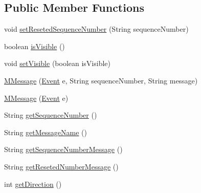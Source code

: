 \subsection*{Public Member Functions}
\begin{DoxyCompactItemize}
\item 
void \hyperlink{classorg_1_1tzi_1_1use_1_1gui_1_1views_1_1diagrams_1_1behavior_1_1communicationdiagram_1_1_m_message_a8eb875d8fff321abd7984dc966efe0e4}{set\-Reseted\-Sequence\-Number} (String sequence\-Number)
\item 
boolean \hyperlink{classorg_1_1tzi_1_1use_1_1gui_1_1views_1_1diagrams_1_1behavior_1_1communicationdiagram_1_1_m_message_a2e6adcd203522b187a2db3bc5a424a6e}{is\-Visible} ()
\item 
void \hyperlink{classorg_1_1tzi_1_1use_1_1gui_1_1views_1_1diagrams_1_1behavior_1_1communicationdiagram_1_1_m_message_a26499a2bac9e344e7029009be9c83bd7}{set\-Visible} (boolean is\-Visible)
\item 
\hyperlink{classorg_1_1tzi_1_1use_1_1gui_1_1views_1_1diagrams_1_1behavior_1_1communicationdiagram_1_1_m_message_a6a9c4ba3f6f6f963a26c6a9161a6a6dd}{M\-Message} (\hyperlink{classorg_1_1tzi_1_1use_1_1uml_1_1sys_1_1events_1_1_event}{Event} e, String sequence\-Number, String message)
\item 
\hyperlink{classorg_1_1tzi_1_1use_1_1gui_1_1views_1_1diagrams_1_1behavior_1_1communicationdiagram_1_1_m_message_ae9d370166a1b7b5be2c1ab822b1d2e92}{M\-Message} (\hyperlink{classorg_1_1tzi_1_1use_1_1uml_1_1sys_1_1events_1_1_event}{Event} e)
\item 
String \hyperlink{classorg_1_1tzi_1_1use_1_1gui_1_1views_1_1diagrams_1_1behavior_1_1communicationdiagram_1_1_m_message_aa2af6887fec594e797fb066eeadf196d}{get\-Sequence\-Number} ()
\item 
String \hyperlink{classorg_1_1tzi_1_1use_1_1gui_1_1views_1_1diagrams_1_1behavior_1_1communicationdiagram_1_1_m_message_a6c1b458c03e7a894496dc4d559e0edc4}{get\-Message\-Name} ()
\item 
String \hyperlink{classorg_1_1tzi_1_1use_1_1gui_1_1views_1_1diagrams_1_1behavior_1_1communicationdiagram_1_1_m_message_a810bd54eeaccb80d2cf352b2c2fdbe9d}{get\-Sequence\-Number\-Message} ()
\item 
String \hyperlink{classorg_1_1tzi_1_1use_1_1gui_1_1views_1_1diagrams_1_1behavior_1_1communicationdiagram_1_1_m_message_a55d143d17117a1b55805444d28b7dc93}{get\-Reseted\-Number\-Message} ()
\item 
int \hyperlink{classorg_1_1tzi_1_1use_1_1gui_1_1views_1_1diagrams_1_1behavior_1_1communicationdiagram_1_1_m_message_a289ee8d5fd2bcc9e7da33153812f093c}{get\-Direction} ()

\end{DoxyCompactItemize}
